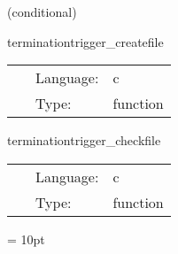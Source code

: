 \vspace{5mm}

   (conditional) 

\hspace{5mm} terminationtrigger\_createfile 

\hspace{5mm}{\it create termination file } 


\hspace{5mm}

 \begin{tabular*}{160mm}{cll} 
~ & Language:  & c \\ 
~ & Type:  & function \\ 
\end{tabular*} 


\vspace{5mm}


\hspace{5mm} terminationtrigger\_checkfile 

\hspace{5mm}{\it check termination file } 


\hspace{5mm}

 \begin{tabular*}{160mm}{cll} 
~ & Language:  & c \\ 
~ & Type:  & function \\ 
\end{tabular*} 



\vspace{5mm}\parskip = 10pt 

